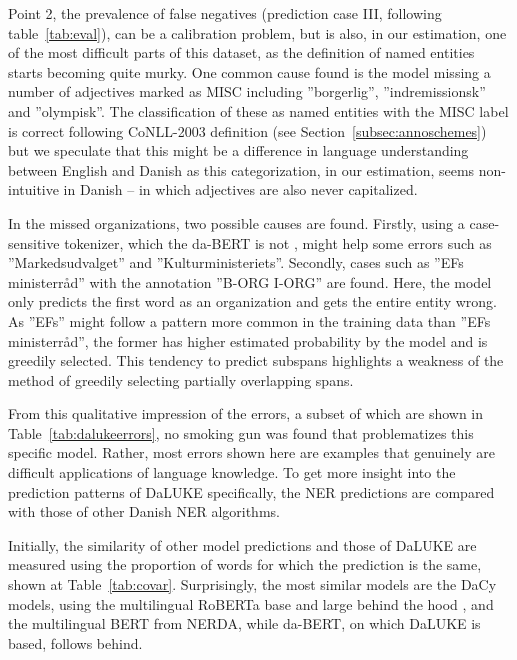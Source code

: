 \documentclass[main.tex]{subfiles}
\begin{document}
Point 2, the prevalence of false negatives (prediction case III, following table~\ref{tab:eval}), can be a calibration problem,
but is also, in our estimation, one of the most difficult parts of this dataset, as the definition of named entities starts becoming quite murky.
One common cause found is the model missing a number of adjectives marked as MISC including ''borgerlig'', ''indremissionsk'' and ''olympisk''.
The classification of these as named entities with the MISC label is correct following CoNLL-2003 definition (see Section~\ref{subsec:annoschemes}) but we speculate that this might be a difference in language understanding between English and Danish as this categorization, in our estimation, seems non-intuitive in Danish -- in which adjectives are also never capitalized.

In the missed organizations, two possible causes are found.
Firstly, using a case-sensitive tokenizer, which the da-BERT is not \cite{botxo2019dabert}, might help some errors such as ''Markedsudvalget'' and ''Kulturministeriets''.
Secondly, cases such as ''EFs ministerråd'' with the annotation ''B-ORG I-ORG'' are found.
Here, the model only predicts the first word as an organization and gets the entire entity wrong.
As ''EFs'' might follow a pattern more common in the training data than ''EFs ministerråd'', the former has higher estimated probability by the model and is greedily selected.
This tendency to predict subspans highlights a weakness of the method of greedily selecting partially overlapping spans.

From this qualitative impression of the errors, a subset of which are shown in Table~\ref{tab:dalukeerrors}, no smoking gun was found that problematizes this specific model.
Rather, most errors shown here are examples that genuinely are difficult applications of language knowledge.
To get more insight into the prediction patterns of DaLUKE specifically, the NER predictions are compared with those of other Danish NER algorithms.

Initially, the similarity of other model predictions and those of DaLUKE are measured using the proportion of words for which the prediction is the same, shown at Table~\ref{tab:covar}.
Surprisingly, the most similar models are the DaCy models, using the multilingual RoBERTa base and large behind the hood \cite{enevoldsen2020dacy}, and the multilingual BERT from NERDA, while da-BERT, on which DaLUKE is based, follows behind.
\end{document}
